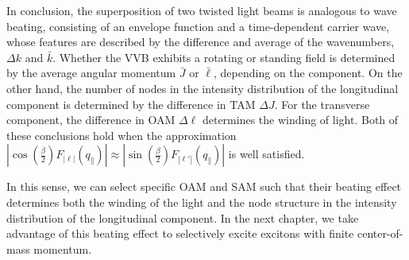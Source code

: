 In conclusion, the superposition of two twisted light beams is analogous to wave beating, consisting of an envelope function and a time-dependent carrier wave, whose features are described by the difference and average of the wavenumbers, $\Delta k$ and $\bar{k}$. Whether the VVB exhibits a rotating or standing field is determined by the average angular momentum $\bar{J}$ or $\bar{\ell}$, depending on the component. On the other hand, the number of nodes in the intensity distribution of the longitudinal component is determined by the difference in TAM $\Delta J$. For the transverse component, the difference in OAM $\Delta \ell$ determines the winding of light. Both of these conclusions hold when the approximation $|\cos\left(\tfrac{\beta}{2}\right)F_{\left|\ell\right|}(q_{\parallel})| \approx |\sin\left(\tfrac{\beta}{2}\right)F_{\left|\ell'\right|}(q_{\parallel})|$ is well satisfied.

In this sense, we can select specific OAM and SAM such that their beating effect determines both the winding of the light and the node structure in the intensity distribution of the longitudinal component. In the next chapter, we take advantage of this beating effect to selectively excite excitons with finite center-of-mass momentum.
\endgroup





